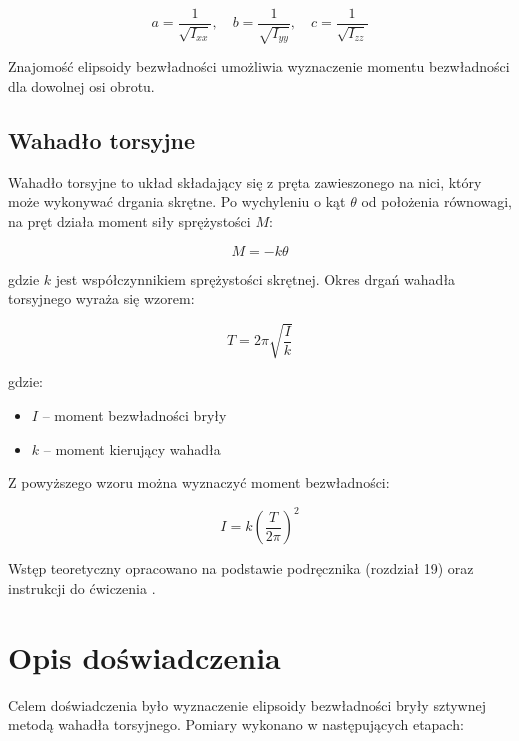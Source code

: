 \documentclass[a4paper,12pt]{article}
\begin{document}
\begin{equation*}
    a = \frac{1}{\sqrt{I_{xx}}}, \quad
    b = \frac{1}{\sqrt{I_{yy}}}, \quad
    c = \frac{1}{\sqrt{I_{zz}}}
\end{equation*}

Znajomość elipsoidy bezwładności umożliwia wyznaczenie momentu bezwładności dla dowolnej osi obrotu.

\subsection*{Wahadło torsyjne}

Wahadło torsyjne to układ składający się z pręta zawieszonego na nici, który może wykonywać drgania skrętne. Po wychyleniu o kąt $\theta$ od położenia równowagi, na pręt działa moment siły sprężystości $M$:

\begin{equation}
    M = -k\theta
\end{equation}

gdzie $k$ jest współczynnikiem sprężystości skrętnej. Okres drgań wahadła torsyjnego wyraża się wzorem:

\begin{equation} \label{eq:okres_drgan_w_zaleznosci_od_momentu_bezwladnosci}
    T = 2\pi \sqrt{\frac{I}{k}}
\end{equation}

gdzie:
\begin{itemize}
    \item $I$ -- moment bezwładności bryły
    \item $k$ -- moment kierujący wahadła
\end{itemize}

Z powyższego wzoru można wyznaczyć moment bezwładności:

\begin{equation} \label{eq:moment_bezwladnosci_w_zaleznosci_od_okresu}
    I = k \left(\frac{T}{2\pi}\right)^2
\end{equation}

Wstęp teoretyczny opracowano na podstawie podręcznika \cite{Drynski1976} (rozdział 19) oraz instrukcji do ćwiczenia \cite{lab11manual}.
\section{Opis doświadczenia}

Celem doświadczenia było wyznaczenie elipsoidy bezwładności bryły sztywnej metodą wahadła torsyjnego. Pomiary wykonano w następujących etapach:
\end{document}
